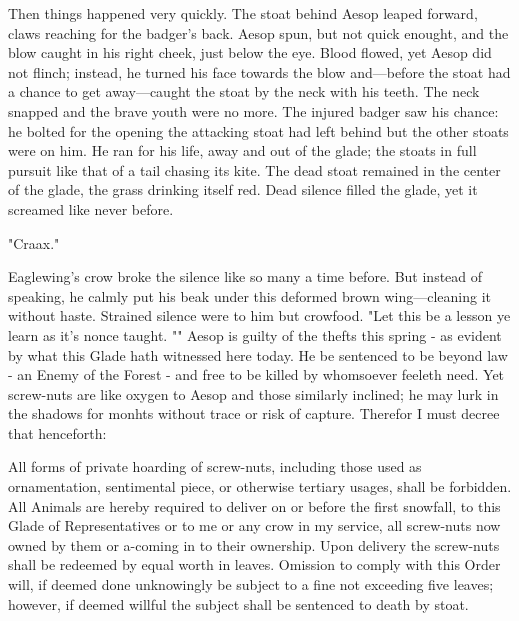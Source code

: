 Then things happened very quickly. The stoat behind Aesop leaped forward, claws reaching for the badger's back. Aesop spun, but not quick enought, and the blow caught in his right cheek, just below the eye. Blood flowed, yet Aesop did not flinch; instead, he turned his face towards the blow and—before the stoat had a chance to get away—caught the stoat by the neck with his teeth. The neck snapped and the brave youth were no more. The injured badger saw his chance: he bolted for the opening the attacking stoat had left behind but the other stoats were on him. He ran for his life, away and out of the glade; the stoats in full pursuit like that of a tail chasing its kite.%
  The dead stoat remained in the center of the glade, the grass drinking itself red. Dead silence filled the glade, yet it screamed like never before.%

"Craax."

Eaglewing's crow broke the silence like so many a time before. But instead of speaking, he calmly put his beak under this deformed brown wing—cleaning it without haste. Strained silence were to him but crowfood. "Let this be a lesson ye learn as it's nonce taught. ""
Aesop is guilty of the thefts this spring - as evident by what this Glade hath witnessed here today. He be sentenced to be beyond law - an Enemy of the Forest - and free to be killed by whomsoever feeleth need. Yet screw-nuts are like oxygen to Aesop and those similarly inclined; he may lurk in the shadows for monhts without trace or risk of capture. Therefor I must decree that henceforth: 

	All forms of private hoarding of screw-nuts, including those used as ornamentation, sentimental piece, or otherwise tertiary usages, shall be forbidden. All Animals are hereby required to deliver on or before the first snowfall, to this Glade of Representatives or to me or any crow in my service, all screw-nuts now owned by them or a-coming in to their ownership. Upon delivery the screw-nuts shall be redeemed by equal worth in leaves. Omission to comply with this Order will, if deemed done unknowingly be subject to a fine not exceeding five leaves; however, if deemed willful the subject shall be sentenced to death by stoat.


